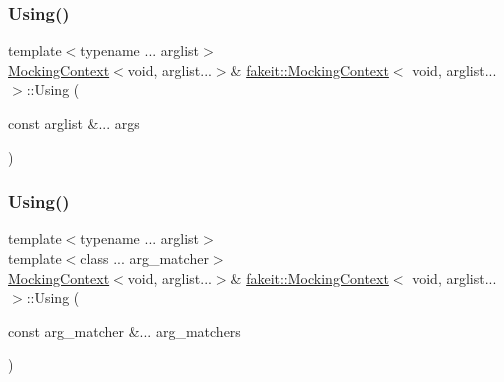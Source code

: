 \subsubsection{\texorpdfstring{Using()}{Using()}\hspace{0.1cm}{\footnotesize\ttfamily [12/18]}}
{\footnotesize\ttfamily template$<$typename ... arglist$>$ \\
\mbox{\hyperlink{classfakeit_1_1MockingContext}{Mocking\+Context}}$<$void, arglist...$>$\& \mbox{\hyperlink{classfakeit_1_1MockingContext}{fakeit\+::\+Mocking\+Context}}$<$ void, arglist... $>$\+::Using (\begin{DoxyParamCaption}\item[{const arglist \&...}]{args }\end{DoxyParamCaption})\hspace{0.3cm}{\ttfamily [inline]}}

\mbox{\label{classfakeit_1_1MockingContext_3_01void_00_01arglist_8_8_8_01_4_aaab0ad3883ab87bd3885671e3266546e}} 
\subsubsection{\texorpdfstring{Using()}{Using()}\hspace{0.1cm}{\footnotesize\ttfamily [13/18]}}
{\footnotesize\ttfamily template$<$typename ... arglist$>$ \\
template$<$class ... arg\+\_\+matcher$>$ \\
\mbox{\hyperlink{classfakeit_1_1MockingContext}{Mocking\+Context}}$<$void, arglist...$>$\& \mbox{\hyperlink{classfakeit_1_1MockingContext}{fakeit\+::\+Mocking\+Context}}$<$ void, arglist... $>$\+::Using (\begin{DoxyParamCaption}\item[{const arg\+\_\+matcher \&...}]{arg\+\_\+matchers }\end{DoxyParamCaption})\hspace{0.3cm}{\ttfamily [inline]}}

\mbox{\label{classfakeit_1_1MockingContext_3_01void_00_01arglist_8_8_8_01_4_aaab0ad3883ab87bd3885671e3266546e}} 
